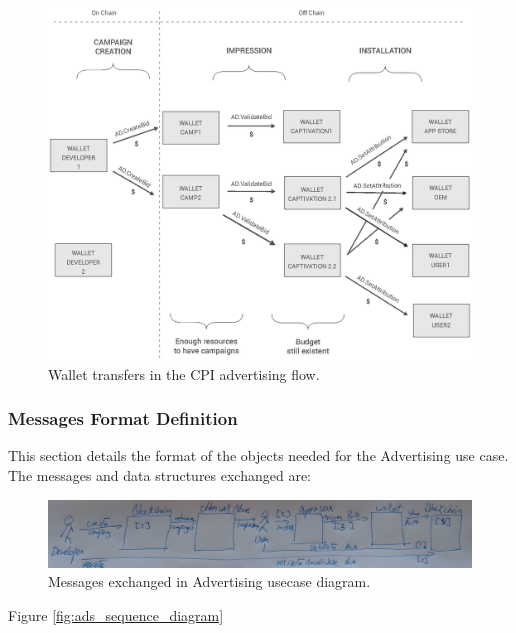 \begin{figure}[H]
\centering
\includegraphics[width=\textwidth]{diagrams/wallet_transfers.eps}
\caption{Wallet transfers in the CPI advertising flow.}
\label{fig:wallet_cpi_flow}
\end{figure}

\subsubsection{Messages Format Definition}
\label{sssec:ads_fd}

This section details the format of the objects needed for the Advertising use case. \\

The messages and data structures exchanged are:

\begin{figure}[H]
\centering
\includegraphics[width=\textwidth]{diagrams/messages_exchanged_diagram.png}
\caption{Messages exchanged in Advertising usecase diagram.}
\label{fig:messages_diagram}
\end{figure}


Figure \ref{fig:ads_sequence_diagram}  


